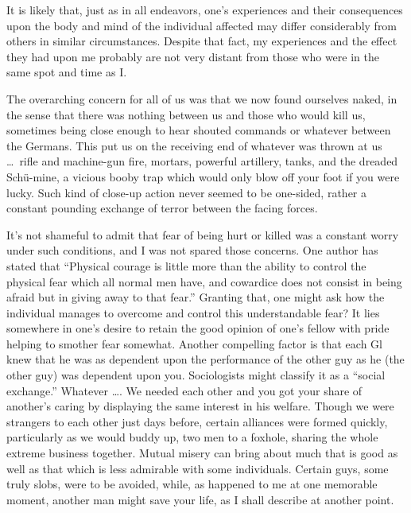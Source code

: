 \documentclass[../m3y]{subfiles}
\begin{document}
\label{beginning-of-action}
It is likely that, just as in all endeavors, one's experiences and their consequences upon the body and mind of the individual affected may differ considerably from others in similar circumstances. Despite that fact, my experiences and the effect they had upon me probably are not very distant from those who were in the same spot and time as I.

The overarching concern for all of us was that we now found ourselves naked, in the sense that there was nothing between us and those who would kill us, sometimes being close enough to hear shouted commands or whatever between the Germans. This put us on the receiving end of whatever was thrown at us \ldots\ rifle and machine-gun fire, mortars, powerful artillery, tanks, and the dreaded Sch{\"u}-mine, a vicious booby trap which would only blow off your foot if you were lucky. Such kind of close-up action never seemed to be one-sided, rather a constant pounding exchange of terror between the facing forces.

It's not shameful to admit that fear of being hurt or killed was a constant worry under such conditions, and I was not spared those concerns. One author has stated that ``Physical courage is little more than the ability to control the physical fear which all normal men have, and cowardice does not consist in being afraid but in giving away to that fear.'' Granting that, one might ask how the individual manages to overcome and control this understandable fear? It lies somewhere in one's desire to retain the good opinion of one's fellow with pride helping to smother fear somewhat. Another compelling factor is that each Gl knew that he was as dependent upon the performance of the other guy as he (the other guy) was dependent upon you. Sociologists might classify it as a ``social exchange.'' Whatever \ldots\@. We needed each other and you got your share of another's caring by displaying the same interest in his welfare. Though we were strangers to each other just days before, certain alliances were formed quickly, particularly as we would buddy up, two men to a foxhole, sharing the whole extreme business together. Mutual misery can bring about much that is good as well as that which is less admirable with some individuals. Certain guys, some truly slobs, were to be avoided, while, as happened to me at one memorable moment, another man might save your life, as I shall describe at another point.
\end{document}
